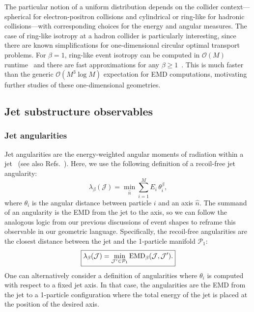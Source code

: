 \documentclass[letterpaper,11pt]{article}
\DeclareRobustCommand{\Refs}[1]{Refs.~\cite{#1}}
\begin{document}
The particular notion of a uniform distribution depends on the collider context---spherical for electron-positron collisions and cylindrical or ring-like for hadronic collisions---with corresponding choices for the energy and angular measures.
%
The case of ring-like isotropy at a hadron collider is particularly interesting, since there are known simplifications for one-dimensional circular optimal transport problems.
%
For $\beta = 1$, ring-like event isotropy can be computed in $\mathcal O(M)$ runtime~\cite{DBLP:journals/jmiv/RabinDG11} and there are fast approximations for any $\beta\ge1$~\cite{DBLP:journals/jmiv/RabinDG11}.
%
This is much faster than the generic $\mathcal O(M^3 \log M)$ expectation for EMD computations, motivating further studies of these one-dimensional geometries.


\subsection{Jet substructure observables}
\label{sec:jetobservables}

\subsubsection{Jet angularities}


Jet angularities are the energy-weighted angular moments of radiation within a jet~\cite{Ellis:2010rwa} (see also \Refs{Almeida:2008yp,Larkoski:2014uqa,Larkoski:2014pca}).
%
Here, we use the following definition of a recoil-free jet angularity:
%
\begin{equation}
\lambda_\beta(\mathcal J) = \min_{\hat n} \sum_{i=1}^M E_i \,\theta_{i}^\beta,
\end{equation}
%
where $\theta_{i}$ is the angular distance between particle $i$ and an axis $\hat n$.
%
The summand of an angularity is the EMD from the jet to the axis, so we can follow the analogous logic from our previous discussions of event shapes to reframe this observable in our geometric language.
%
Specifically, the recoil-free angularities are the closest distance between the jet and the 1-particle manifold $\mathcal{P}_1$:
%
\begin{equation}
\label{eq:emd_jet_angularities}
\begin{boxed}{
\lambda_\beta(\mathcal J) = \min_{\mathcal J'\in\mathcal P_1} \text{EMD}_{\beta}(\mathcal J, \mathcal J').
}\end{boxed}
\end{equation}
%
One can alternatively consider a definition of angularities where $\theta_{i}$ is computed with respect to a fixed jet axis.
%
In that case, the angularities are the EMD from the jet to a 1-particle configuration where the total energy of the jet is placed at the position of the desired axis.
\end{document}
